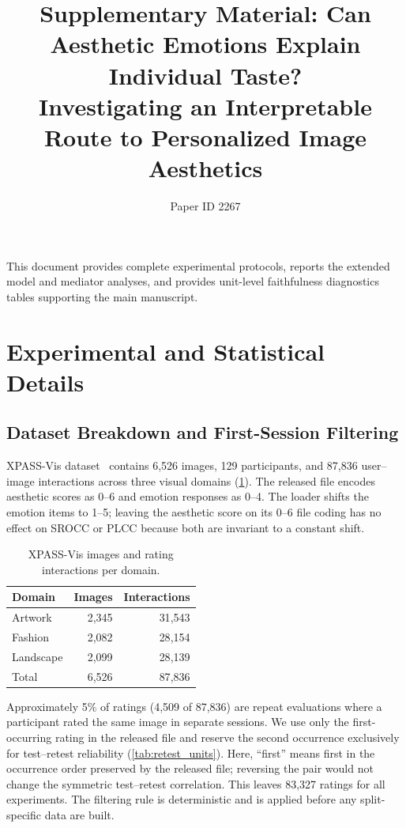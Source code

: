 \documentclass[10pt,twocolumn,letterpaper]{article}
\title{Supplementary Material: Can Aesthetic Emotions Explain Individual Taste? \\Investigating an Interpretable Route to Personalized Image Aesthetics}
\author{Paper ID 2267}
\begin{document}
\maketitle

This document provides complete experimental protocols, reports the extended model and mediator analyses, and provides unit-level
faithfulness diagnostics tables supporting the main manuscript.
\section{Experimental and Statistical Details}
\label{sec:supp_exp_stat}

\subsection{Dataset Breakdown and First-Session Filtering}

XPASS-Vis dataset~\cite{hayashi2026xpassvis} contains 6,526 images, 129 participants,
and 87,836 user--image interactions across three visual domains (\cref{tab:domain_counts}). 
The released file encodes aesthetic scores as 0--6 and emotion responses as 0--4. The loader shifts the emotion items to 1--5; leaving the aesthetic score on its 0--6 file coding has no effect on SROCC or PLCC because both are invariant to a constant shift.

\begin{table}[h]
\centering
\caption{XPASS-Vis images and rating interactions per domain.}
\label{tab:domain_counts}
\begin{tabular}{lrr}
\toprule
Domain & Images & Interactions \\
\midrule
Artwork    & 2{,}345 & 31{,}543 \\
Fashion    & 2{,}082 & 28{,}154 \\
Landscape  & 2{,}099 & 28{,}139 \\
\midrule
Total      & 6{,}526 & 87{,}836 \\
\bottomrule
\end{tabular}
\end{table}

Approximately 5\% of ratings (4,509 of 87,836) are repeat evaluations where a participant rated the same image in separate sessions. 
We use only the first-occurring rating in the
released file and reserve the second occurrence exclusively for test--retest reliability (\cref{tab:retest_units}). 
Here, ``first'' means first in the occurrence order preserved by the released file;
reversing the pair would not change the symmetric test--retest correlation. This leaves 83,327 ratings for all experiments.
The filtering rule is deterministic and is applied before any split-specific data are built.
\end{document}
